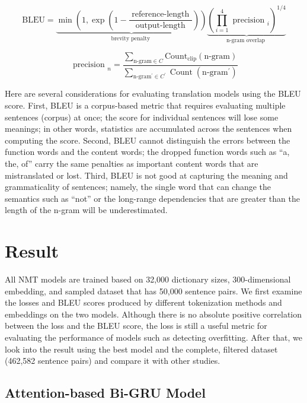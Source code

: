 \begin{equation}
    \mathrm{BLEU}=\underbrace{\min \left(1, \exp \left(1-\frac{\text { reference-length }}{\text { output-length }}\right)\right)}_{\text {brevity penalty }} \underbrace{\left(\prod_{i=1}^{4} \text { precision }_{i}\right)^{1 / 4}}_{\text {n-gram overlap }} \label{eq:eq16}
\end{equation}

\begin{equation}
    \text { precision }_{n} = \frac{\sum_{ \text {n-gram} \in C} \text {Count}_{\text {clip}}(\text {n-gram})}{\sum_{\text{n-gram}^{\prime} \in C^{\prime}} \operatorname{Count}\left(\text{n-gram}^{\prime}\right)} \label{eq:eq17}
\end{equation}

Here are several considerations for evaluating translation models using the BLEU score. First, BLEU is a corpus-based metric that requires evaluating multiple sentences (corpus) at once; the score for individual sentences will lose some meanings; in other words, statistics are accumulated across the sentences when computing the score. Second, BLEU cannot distinguish the errors between the function words and the content words; the dropped function words such as ``a, the, of'' carry the same penalties as important content words that are mistranslated or lost. Third, BLEU is not good at capturing the meaning and grammaticality of sentences; namely, the single word that can change the semantics such as ``not'' or the long-range dependencies that are greater than the length of the n-gram will be underestimated.

\section{Result} \label{sec:result}

All NMT models are trained based on 32,000 dictionary sizes, 300-dimensional embedding, and sampled dataset that has 50,000 sentence pairs. We first examine the losses and BLEU scores produced by different tokenization methods and embeddings on the two models. Although there is no absolute positive correlation between the loss and the BLEU score, the loss is still a useful metric for evaluating the performance of models such as detecting overfitting. After that, we look into the result using the best model and the complete, filtered dataset (462,582 sentence pairs) and compare it with other studies.

\subsection{Attention-based Bi-GRU Model}

